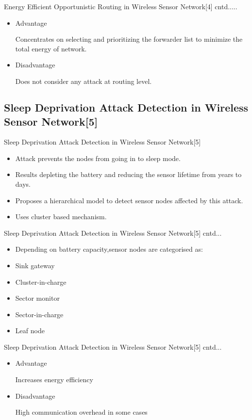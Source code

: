 \begin{frame}{Energy Efficient Opportunistic Routing in Wireless Sensor Network[4] cntd.....}
\begin{itemize}
\item Advantage

Concentrates on selecting and prioritizing the forwarder list to  minimize the total energy of network.
\item Disadvantage

Does not consider any attack at routing level.
\end{itemize}
\end{frame}


\subsection{Sleep Deprivation Attack Detection in  Wireless Sensor Network[5]}
\begin{frame}{Sleep Deprivation Attack Detection in  Wireless Sensor Network[5]}
\begin{itemize}
\item Attack prevents the nodes from going in to sleep mode.
\item Results depleting the battery and reducing the sensor lifetime from years to days.
\item Proposes a hierarchical model to detect sensor nodes affected by this attack.
\item Uses cluster based mechanism.
\end{itemize}
\end{frame}

\begin{frame}{Sleep Deprivation Attack Detection in  Wireless Sensor Network[5] cntd...}
\begin{itemize}

\item Depending on battery capacity,sensor nodes are categorised as:


\item Sink gateway
\item Cluster-in-charge
\item Sector monitor
\item Sector-in-charge
\item Leaf node

\end{itemize}
\end{frame}


  
  \begin{frame}{Sleep Deprivation Attack Detection in  Wireless Sensor Network[5] cntd...}
\begin{itemize}
\item Advantage

Increases energy efficiency
\item Disadvantage

High communication overhead in some cases
\end{itemize}
  
  \end{frame}
  
